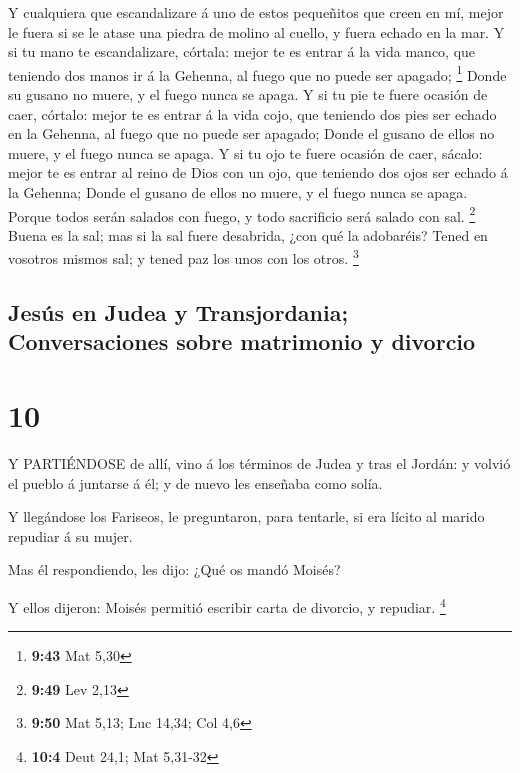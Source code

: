  Y cualquiera que escandalizare á uno de estos pequeñitos
que creen en mí, mejor le fuera si se le atase una piedra de molino al
cuello, y fuera echado en la mar.  Y si tu mano te
escandalizare, córtala: mejor te es entrar á la vida manco, que teniendo
dos manos ir á la Gehenna, al fuego que no puede ser apagado;
\footnote{\textbf{9:43} Mat 5,30}  Donde su gusano no
muere, y el fuego nunca se apaga.  Y si tu pie te fuere
ocasión de caer, córtalo: mejor te es entrar á la vida cojo, que
teniendo dos pies ser echado en la Gehenna, al fuego que no puede ser
apagado;  Donde el gusano de ellos no muere, y el fuego
nunca se apaga.  Y si tu ojo te fuere ocasión de caer,
sácalo: mejor te es entrar al reino de Dios con un ojo, que teniendo dos
ojos ser echado á la Gehenna;  Donde el gusano de ellos no
muere, y el fuego nunca se apaga.  Porque todos serán
salados con fuego, y todo sacrificio será salado con sal. \footnote{\textbf{9:49}
  Lev 2,13}  Buena es la sal; mas si la sal fuere
desabrida, ¿con qué la adobaréis? Tened en vosotros mismos sal; y tened
paz los unos con los otros. \footnote{\textbf{9:50} Mat 5,13; Luc 14,34;
  Col 4,6}

\hypertarget{jesuxfas-en-judea-y-transjordania-conversaciones-sobre-matrimonio-y-divorcio}{%
\subsection{Jesús en Judea y Transjordania; Conversaciones sobre
matrimonio y
divorcio}\label{jesuxfas-en-judea-y-transjordania-conversaciones-sobre-matrimonio-y-divorcio}}

\hypertarget{section-9}{%
\section{10}\label{section-9}}

 Y PARTIÉNDOSE de allí, vino á los términos de Judea y tras
el Jordán: y volvió el pueblo á juntarse á él; y de nuevo les enseñaba
como solía.

 Y llegándose los Fariseos, le preguntaron, para tentarle,
si era lícito al marido repudiar á su mujer.

 Mas él respondiendo, les dijo: ¿Qué os mandó Moisés?

 Y ellos dijeron: Moisés permitió escribir carta de
divorcio, y repudiar. \footnote{\textbf{10:4} Deut 24,1; Mat 5,31-32}

